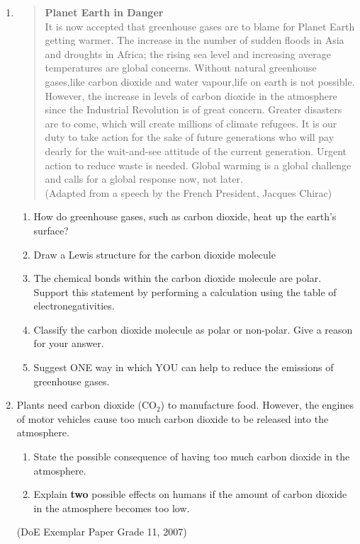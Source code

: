 {\begin{enumerate}
\item{
\begin{quote}
\textbf{Planet Earth in Danger}\\ It is now accepted that greenhouse gases are to blame for Planet Earth getting warmer. The increase in the number of sudden floods in Asia and droughts in Africa; the rising sea level and increasing average temperatures are global concerns. Without natural greenhouse gases,like carbon dioxide and water vapour,life on earth is not possible. However, the increase in levels of carbon dioxide in the atmosphere since the Industrial Revolution is of great concern. Greater disasters are to come, which will create millions of climate refugees. It is our duty to take action for the sake of future generations who will pay dearly for the wait-and-see attitude of the current generation. Urgent action to reduce waste is needed. Global warming is a global challenge and calls for a global response now, not later.\\ (Adapted from a speech by the French President, Jacques Chirac)\\ 

\end{quote}

\begin{enumerate} 
\item How do greenhouse gases, such as carbon dioxide, heat up the earth's surface?\\ 
\item Draw a Lewis structure for the carbon dioxide molecule\\ 
\item The chemical bonds within the carbon dioxide molecule are polar. Support this statement by performing a calculation using the table of electronegativities.\\ 
\item Classify the carbon dioxide molecule as polar or non-polar. Give a reason for your answer.\\ 
\item Suggest ONE way in which YOU can help to reduce the emissions of greenhouse gases.\\ \end{enumerate} 

}

\item{Plants need carbon dioxide (CO$_{2}$) to manufacture food. However, the engines of motor vehicles cause too much carbon dioxide to be released into the atmosphere.}
	\begin{enumerate}
	\item{State the possible consequence of having too much carbon dioxide in the atmosphere.}
	\item{Explain \textbf{two} possible effects on humans if the amount of carbon dioxide in the atmosphere becomes too low.}
	\end{enumerate}

(DoE Exemplar Paper Grade 11, 2007)
\end{enumerate}
}

